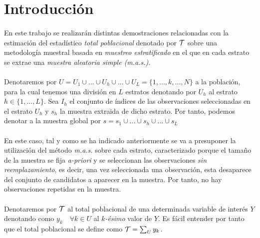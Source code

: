 \documentclass{article}
\begin{document}
  \maketitle



  \section{Introducción}

    \paragraph{}
    En este trabajo se realizarán distintas demostraciones relacionadas con la estimación del estadístico \emph{total poblacional} denotado por $\mathcal{T}$ sobre una metodología muestral basada en \emph{muestreo estratificado} en el que en cada estrato se extrae una \emph{muestra aleatoria simple (m.a.s.)}.

    \paragraph{}
    Denotaremos por $U = U_1 \cup ... \cup U_h \cup... \cup U_L = \{1, ...,k,...,N\} $ a la población, para la cual tenemos una división en $L$ estratos denotando por $U_h$ al estrato $h \in \{1,..., L\}$. Sea $I_h$ el conjunto de índices de las observaciones seleccionadas en el estrato $U_h$ y $s_h$ la muestra extraida de dicho estrato. Por tanto, podemos denotar a la muestra global por $s = s_1 \cup ... \cup s_h \cup ... \cup s_L$

    \paragraph{}
    En este caso, tal y como se ha indicado anteriormente se va a presuponer la utilización del método \emph{m.a.s.} sobre cada estrato, caracterizado porque el tamaño de la muestra se fija \emph{a-priori} y se seleccionan las observaciones \emph{sin reemplazamiento}, es decir, una vez seleccionada una observación, esta desaparece del conjunto de candidatos a aparecer en la muestra. Por tanto, no hay observaciones repetidas en la muestra.

    \paragraph{}
    Denotaremos por $\mathcal{T}$ al total poblacional de una determinada variable de interés $Y$ denotando como $y_k \quad \forall k \in U$ al \emph{$k$-ésimo} valor de $Y$. Es fácil entender por tanto que el total poblacional se define como $\mathcal{T} = \sum_U y_k$.
\end{document}

